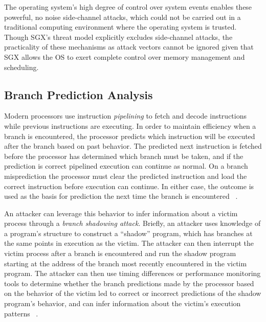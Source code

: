 The operating system's high degree of control over system events enables these powerful, no noise side-channel attacks, which could not be carried out in a traditional computing environment where the operating system is trusted. Though SGX's threat model explicitly excludes side-channel attacks, the practicality of these mechanisms as attack vectors cannot be ignored given that SGX allows the OS to exert complete control over memory management and scheduling.

\subsection{Branch Prediction Analysis}

Modern processors use instruction \emph{pipelining} to fetch and decode instructions while previous instructions are executing. In order to maintain efficiency when a branch is encountered, the processor predicts which instruction will be executed after the branch based on past behavior. The predicted next instruction is fetched before the processor has determined which branch must be taken, and if the prediction is correct pipelined execution can continue as normal. On a branch misprediction the processor must clear the predicted instruction and load the correct instruction before execution can continue. In either case, the outcome is used as the basis for prediction the next time the branch is encountered ~\cite{aciicmez_power_2007, lee_inferring_2017}. 

An attacker can leverage this behavior to infer information about a victim process through a \emph{branch shadowing attack}. Briefly, an attacker uses knowledge of a program's structure to construct a ``shadow'' program, which has branches at the same points in execution as the victim. The attacker can then interrupt the victim process after a branch is encountered and run the shadow program starting at the address of the branch most recently encountered in the victim program. The attacker can then use timing differences or performance monitoring tools to determine whether the branch predictions made by the processor based on the behavior of the victim led to correct or incorrect predictions of the shadow program's behavior, and can infer information about the victim's execution patterns ~\cite{lee_inferring_2017}.

